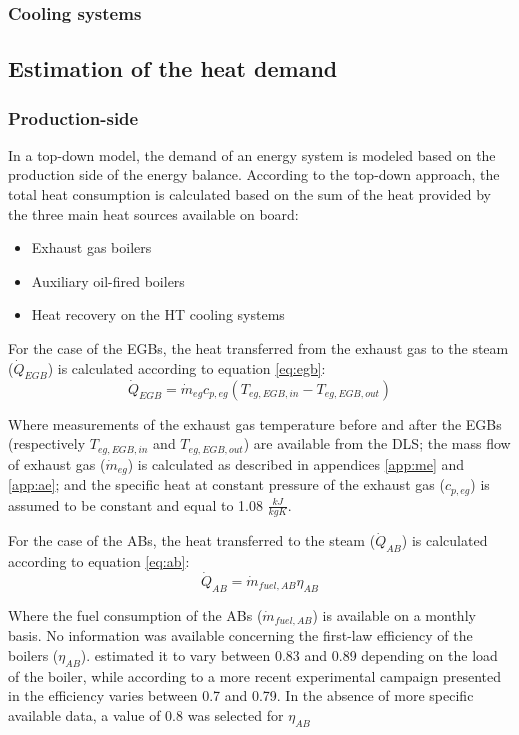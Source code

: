 \documentclass[preprint,12pt]{elsarticle}
\begin{document}
\subsubsection*{Cooling systems}

\subsection{Estimation of the heat demand} \label{sec:met:heat}

\subsubsection*{Production-side}

In a top-down model, the demand of an energy system is modeled based on the production side of the energy balance. According to the top-down approach, the total heat consumption is calculated based on the sum of the heat provided by the three main heat sources available on board:
\begin{itemize}
	\item Exhaust gas boilers
	\item Auxiliary oil-fired boilers
	\item Heat recovery on the HT cooling systems
\end{itemize}

For the case of the EGBs, the heat transferred from the exhaust gas to the steam ($\dot{Q}_{EGB}$) is calculated according to equation \ref{eq:egb}:
\begin{equation}
\dot{Q}_{EGB} = \dot{m}_{eg} c_{p,eg} (T_{eg,EGB,in} - T_{eg,EGB,out})
\end{equation}\label{eq:egb}

Where measurements of the exhaust gas temperature before and after the EGBs (respectively $T_{eg,EGB,in}$ and $T_{eg,EGB,out}$) are available from the DLS; the mass flow of exhaust gas ($\dot{m}_{eg}$) is calculated as described in appendices \ref{app:me} and \ref{app:ae}; and the specific heat at constant pressure of the exhaust gas ($c_{p,eg}$) is assumed to be constant and equal to 1.08 $\frac{kJ}{kgK}$.

For the case of the ABs, the heat transferred to the steam ($\dot{Q}_{AB}$) is calculated according to equation \ref{eq:ab}:
\begin{equation}
\dot{Q}_{AB} = \dot{m}_{fuel,AB} \eta_{AB}
\end{equation} \label{eq:ab}

Where the fuel consumption of the ABs ($\dot{m}_{fuel,AB}$) is available on a monthly basis. No information was available concerning the first-law efficiency of the boilers ($ \eta_{AB}$). \cite{Cohen1962} estimated it to vary between 0.83 and 0.89 depending on the load of the boiler, while according to a more recent experimental campaign presented in \cite{Mrzljak2017} the efficiency varies between 0.7 and 0.79. In the absence of more specific available data, a value of 0.8 was selected for $ \eta_{AB}$
\end{document}
